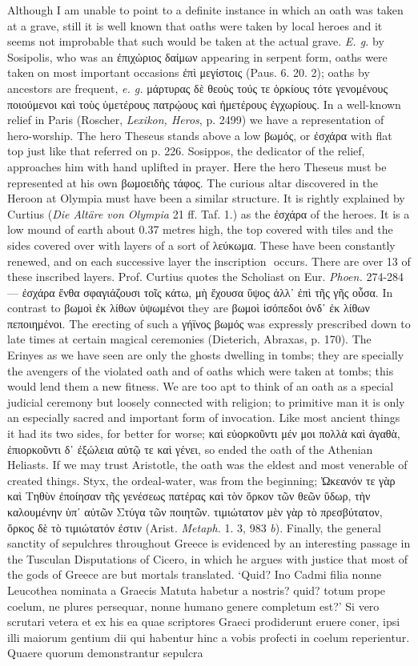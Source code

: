 \documentclass[a4paper, 11pt, oneside, polutonikogreek, english]{article}
\newcommand*\svgAAA{}
\begin{document}
Although I am unable to point to a definite instance in which an oath was taken at a grave, still it is well known that oaths were taken by local heroes and it seems not improbable that such would be taken at the actual grave. \emph{E. g.} by Sosipolis, who was an ἐπιχώριος δαίμων appearing in serpent form, oaths were taken on most important occasions ἐπὶ μεγίστοις (Paus. 6. 20. 2); oaths by ancestors are frequent, \emph{e. g.} μάρτυρας δὲ θεοὺς τούς τε ὁρκίους τότε γενομένους ποιούμενοι καὶ τοὺς ὑμετέρους πατρῴους καὶ ἡμετέρους ἐγχωρίους. In a well-known relief in Paris (Roscher, \emph{Lexikon, Heros}, p. 2499) we have a representation of hero-worship. The hero Theseus stands above a low βωμός, or ἐσχάρα with flat top just like that referred on p. 226. Sosippos, the dedicator of the relief, approaches him with hand uplifted in prayer. Here the hero Theseus must be represented at his own βωμοειδὴς τάφος. The curious altar discovered in the Heroon at Olympia must have been a similar structure. It is rightly explained by Curtius (\emph{Die Altäre von Olympia} 21 ff. Taf. 1.) as the ἐσχάρα of the heroes. It is a low mound of earth about 0.37 metres high, the top covered with tiles and the sides covered over with layers of a sort of λεύκωμα. These have been constantly renewed, and on each successive layer the inscription $\svgAAA$ occurs. There are over 13 of these inscribed layers. Prof. Curtius quotes the Scholiast on Eur. \emph{Phoen.} 274-284 --- ἐσχάρα ἔνθα σφαγιάζουσι τοῖς κάτω, μὴ ἔχουσα ὕψος ἀλλ᾽ ἐπὶ τῆς γῆς οὖσα. In contrast to βωμοὶ ἐκ λίθων ὑψωμένοι they are βωμοὶ ἰσόπεδοι ὀνδ᾽ ἐκ λίθων πεποιημένοι. The erecting of such a γήϊνος βωμός was expressly prescribed down to late times at certain magical ceremonies (Dieterich, Abraxas, p. 170). The Erinyes as we have seen are only the ghosts dwelling in tombs; they are specially the avengers of the violated oath and of oaths which were taken at tombs; this would lend them a new fitness. We are too apt to think of an oath as a special judicial ceremony but loosely connected with religion; to primitive man it is only an especially sacred and important form of invocation. Like most ancient things it had its two sides, for better for worse; καὶ εὐορκοῦντι μέν μοι πολλὰ καὶ ἀγαθὰ, ἐπιορκοῦντι δ᾽ ἐξώλεια αὐτῷ τε καὶ γένει, so ended the oath of the Athenian Heliasts. If we may trust Aristotle, the oath was the eldest and most venerable of created things. Styx, the ordeal-water, was from the beginning; Ὠκεανόν τε γὰρ καὶ Τηθὺν ἐποίησαν τῆς γενέσεως πατέρας καὶ τὸν ὅρκον τῶν θεῶν ὕδωρ, τὴν καλουμένην ὑπ᾽ αὐτῶν Στύγα τῶν ποιητῶν. τιμιώτατον μὲν γὰρ τὸ πρεσβύτατον, ὅρκος δὲ τὸ τιμιώτατόν ἐστιν (Arist. \emph{Metaph.} 1. 3, 983 \emph{b}). Finally, the general sanctity of sepulchres throughout Greece is evidenced by an interesting passage in the Tusculan Disputations of Cicero, in which he argues with justice that most of the gods of Greece are but mortals translated. `Quid? Ino Cadmi filia nonne Leucothea nominata a Graecis Matuta habetur a nostris? quid? totum prope coelum, ne plures persequar, nonne humano genere completum est?' Si vero scrutari vetera et ex his ea quae scriptores Graeci prodiderunt eruere coner, ipsi illi maiorum gentium dii qui habentur hinc a vobis profecti in coelum reperientur. Quaere quorum demonstrantur sepulcra 
\end{document}
